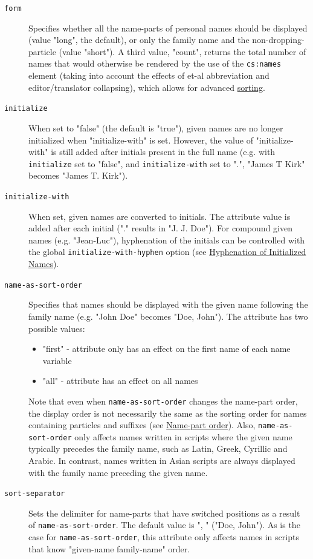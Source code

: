 \begin{description}
\item[\texttt{form}]
Specifies whether all the name-parts of personal names should be
displayed (value "long", the default), or only the family name and the
non-dropping-particle (value "short"). A third value, "count", returns
the total number of names that would otherwise be rendered by the use of
the \texttt{cs:names} element (taking into account the effects of et-al
abbreviation and editor/translator collapsing), which allows for
advanced \protect\hyperlink{sorting}{sorting}.
\item[\texttt{initialize}]
When set to "false" (the default is "true"), given names are no longer
initialized when "initialize-with" is set. However, the value of
"initialize-with" is still added after initials present in the full name
(e.g. with \texttt{initialize} set to "false", and
\texttt{initialize-with} set to ".", "James T Kirk" becomes "James T.
Kirk").
\item[\texttt{initialize-with}]
When set, given names are converted to initials. The attribute value is
added after each initial ("." results in "J. J. Doe"). For compound
given names (e.g. "Jean-Luc"), hyphenation of the initials can be
controlled with the global \texttt{initialize-with-hyphen} option (see
\protect\hyperlink{hyphenation-of-initialized-names}{Hyphenation of
Initialized Names}).
\item[\texttt{name-as-sort-order}]
Specifies that names should be displayed with the given name following
the family name (e.g. "John Doe" becomes "Doe, John"). The attribute has
two possible values:

\begin{itemize}
\tightlist
\item
  "first" - attribute only has an effect on the first name of each name
  variable
\item
  "all" - attribute has an effect on all names
\end{itemize}

Note that even when \texttt{name-as-sort-order} changes the name-part
order, the display order is not necessarily the same as the sorting
order for names containing particles and suffixes (see
\protect\hyperlink{name-part-order}{Name-part order}). Also,
\texttt{name-as-sort-order} only affects names written in scripts where
the given name typically precedes the family name, such as Latin, Greek,
Cyrillic and Arabic. In contrast, names written in Asian scripts are
always displayed with the family name preceding the given name.
\item[\texttt{sort-separator}]
Sets the delimiter for name-parts that have switched positions as a
result of \texttt{name-as-sort-order}. The default value is ", " ("Doe,
John"). As is the case for \texttt{name-as-sort-order}, this attribute
only affects names in scripts that know "given-name family-name" order.
\end{description}

